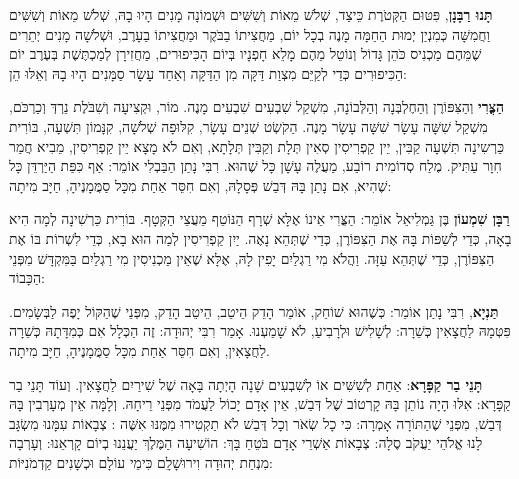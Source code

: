 \textbf{תָּנוּ רַבָּנָן}, פִּטּוּם הַקְּטֹרֶת כֵּיצַד, שְׁלֹשׁ מֵאוֹת וְשִׁשִּׁים וּשְׁמוֹנָה מָנִים הָיוּ בָהּ, שְׁלֹשׁ מֵאוֹת וְשִׁשִּׁים וַחֲמִשָּׁה כְּמִנְיַן יְמוּת הַחַמָּה מָנֶה בְכָל יוֹם, מַחֲצִיתוֹ בַבֹּקֶר וּמַחֲצִיתוֹ בַעָרֶב, וּשְׁלֹשָׁה מָנִים יְתֵרִים שֶׁמֵּהֶם מַכְנִיס כֹּהֵן גָּדוֹל וְנוֹטֵל מֵהֶם מָלֵא חָפְנָיו בְּיוֹם הָכִּיפוּרים, מַחֲזִירָן לְמַכְתֶּשֶׁת בְּעֶרֶב יוֹם הַכִּיפוּרִים כְּדֵי לְקַיֵּם מִצְוַת דַּקָּה מִן הַדַּקָּה וְאַחַד עָשָׂר סַמָּנִים הָיוּ בָהּ וְאֵלּוּ הֵן:

\textbf{הַצֳּרִי} וְהַצִּפּוֹרֶן וְהַחֶלְבְּנָה וְהַלְּבוֹנָה, מִשְׁקַל שִׁבְעִים שִׁבְעִים מָנֶה. מוֹר, וּקְצִיעָה וְשִׁבֹּלֶת נֵרְדְּ וְכַרְכֹּם, מִשְׁקַל שִׁשָּׁה עָשָׂר שִׁשָּׁה עָשָׂר מָנֶה. הַקֹשְׂט שְׁנֵים עָשָׂר, קִלּוּפָה שְׁלֹשָׁה, קִנָּמוֹן תִּשְׁעָה, בּוֹרִית כַּרְשִינָה תִּשְׁעָה קַבִּין, יֵין קַפְרִיסִין סְאִין תְּלָת וְקַבִּין תְּלָתָא, וְאִם לֹא מָצָא יֵין קַפְרִיסִין, מֵבִיא חֲמַר חִוָר עַתִּיק. מֶלַח סְדוֹמִית רוֹבַע, מַעֲלֶה עָשָׁן כָּל שֶׁהוּא. רִבִּי נָתַן הַבַּבְלִי אוֹמֵר: אַף כִּפַּת הַיַּרְדֵּן כָּל שֶׁהִיא, אִם נָתַן בָּהּ דְּבַשׁ פְּסָלָהּ, וְאִם חִסֵּר אַחַת מִכָּל סַמֲּמָנֶיהָ, חַיָּב מִיתָה:

\textbf{רַבָּן שִׁמְעוֹן} בֶּן גַּמְלִיאֵל אוֹמֵר: הַצֳּרִי אֵינוֹ אֶלָּא שְׁרָף הַנּוֹטֵף מֵעֲצֵי הַקְּטָף. בּוֹרִית כַּרְשִׁינָה לְמָה הִיא בָאָה, כְּדֵי לְשַׁפּוֹת בָּהּ אֶת הַצִּפּוֹרֶן, כְּדֵי שֶׁתְּהֵא נָאֶה. יַיִן קַפְרִיסִין לְמַה הוּא בָא, כְּדֵי לִשְׁרוֹת בּוֹ אֶת הַצִּפּוֹרֶן, כְּדֵי שֶׁתְּהֵא עַזָּה. וַהֲלֹא מִי רַגְלַיִם יָפִין לָהּ, אֶלָּא שֶׁאֵין מַכְנִיסִין מִי רַגְלַיִם בַּמִּקְדָּשׁ מִפְּנֵי הַכָּבוֹד:

\textbf{תַּנְיָא}, רִבִּי נָתַן אוֹמֵר: כְּשֶׁהוּא שׁוֹחֵק, אוֹמֵר הָדֵק הֵיטֵב, הֵיטֵב הָדֵק, מִפְּנֵי שֶׁהַקּוֹל יָפֶה לַבְּשָׂמִים. פִּטְּמָהּ לַחֲצָאִין כְּשֵׁרָה: לְשָׁלִישׁ וּלְרָבִיעַ, לֹא שָׁמַעְנוּ. אָמַר רִבִּי יְהוּדָה: זֶה הַכְּלָל אִם כְּמִדָּתָהּ כְּשֵׁרָה לַחֲצָאִין, וְאִם חִסֵּר אַחַת מִכָּל סַמֲּמָנֶיהָ, חַיָּב מִיתָה.

\textbf{תָּנֵי בַר קַפָּרָא}: אַחַת לְשִׁשִּׁים אוֹ לְשִׁבְעִים שָׁנָה הָיְתָה בָּאָה שֶׁל שִׁירַיִם לַחֲצָאִין. וְעוֹד תָּנֵי בַר קַפָּרָא: אִלּוּ הָיָה נוֹתֵן בָּהּ קָרְטוֹב שֶׁל דְּבַשׁ, אֵין אָדָם יָכוֹל לַעֲמֹד מִפְּנֵי רֵיחָהּ. וְלָמָּה אֵין מְעָרְבִין בָּהּ דְּבַשׁ, מִפְּנֵי שֶׁהַתּוֹרָה אָמְרָה: כִּי כָל שְׂאֹר וְכָל דְּבַשׁ לֹא תַקְטִירוּ מִמֶּנּוּ אִשֶּׁה : \Shem{} צְבָאוֹת עִמָּנוּ מִשְׂגָּב לָנוּ אֱלֹהֵי יַעֲקֹב סֶלָה: \Shem{} צְבָאוֹת אַשְׁרֵי אָדָם בֹּטֵחַ בָּךְ: \Shem{} הוֹשִׁיעָה הַמֶּלֶךְ יַעֲנֵנוּ בְיוֹם קָרְאֵנוּ: וְעָרְבָה  מִנְחַת יְהוּדָה וִירוּשָׁלִָם כִּימֵי עוֹלָם וּכְשָׁנִים קַדְמֹנִיּוֹת:

